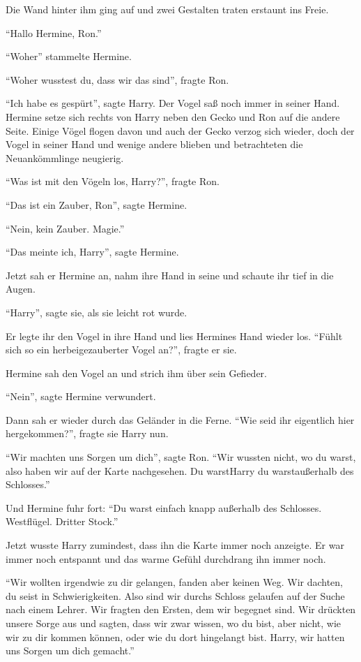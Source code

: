 Die Wand hinter ihm ging auf und zwei Gestalten traten erstaunt ins Freie.

\enquote{Hallo Hermine, Ron.}

\enquote{Woher\abs} stammelte Hermine.

\enquote{Woher wusstest du, dass wir das sind}, fragte Ron.

\enquote{Ich habe es gespürt}, sagte Harry. Der Vogel saß noch immer in seiner Hand. Hermine setze sich rechts von Harry neben den Gecko und Ron auf die andere Seite. Einige Vögel flogen davon und auch der Gecko verzog sich wieder, doch der Vogel in seiner Hand und wenige andere blieben und betrachteten die Neuankömmlinge neugierig.

\enquote{Was ist mit den Vögeln los, Harry?}, fragte Ron.

\enquote{Das ist ein Zauber, Ron}, sagte Hermine.

\enquote{Nein, kein Zauber. Magie.}

\enquote{Das meinte ich, Harry}, sagte Hermine.

Jetzt sah er Hermine an, nahm ihre Hand in seine und schaute ihr tief in die Augen.

\enquote{Harry}, sagte sie, als sie leicht rot wurde.

Er legte ihr den Vogel in ihre Hand und lies Hermines Hand wieder los. \enquote{Fühlt sich so ein herbeigezauberter Vogel an?}, fragte er sie.

Hermine sah den Vogel an und strich ihm über sein Gefieder.

\enquote{Nein}, sagte Hermine verwundert.

Dann sah er wieder durch das Geländer in die Ferne. \enquote{Wie seid ihr eigentlich hier hergekommen?}, fragte sie Harry nun.

\enquote{Wir machten uns Sorgen um dich}, sagte Ron. \enquote{Wir wussten nicht, wo du warst, also haben wir auf der Karte nachgesehen. Du warst\abs Harry du warst\abs außerhalb des Schlosses.}

Und Hermine fuhr fort: \enquote{Du warst einfach knapp außerhalb des Schlosses. Westflügel. Dritter Stock.}

Jetzt wusste Harry zumindest, dass ihn die Karte immer noch anzeigte. Er war immer noch entspannt und das warme Gefühl durchdrang ihn immer noch.

\enquote{Wir wollten irgendwie zu dir gelangen, fanden aber keinen Weg. Wir dachten, du seist in Schwierigkeiten. Also sind wir durchs Schloss gelaufen auf der Suche nach einem Lehrer. Wir fragten den Ersten, dem wir begegnet sind. Wir drückten unsere Sorge aus und sagten, dass wir zwar wissen, wo du bist, aber nicht, wie wir zu dir kommen können, oder wie du dort hingelangt bist. Harry, wir hatten uns Sorgen um dich gemacht.}

